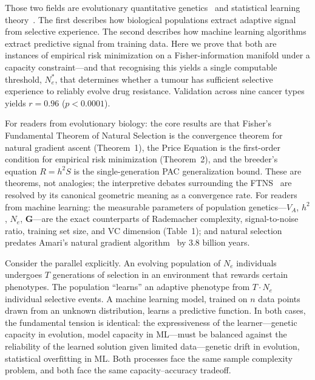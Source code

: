 \documentclass[12pt]{article}
\theoremstyle{remark}
\begin{document}
Those two fields are evolutionary quantitative genetics~\cite{fisher1918,price1970,lande1979} and statistical learning theory~\cite{vapnik1971,valiant1984}. The first describes how biological populations extract adaptive signal from selective experience. The second describes how machine learning algorithms extract predictive signal from training data. Here we prove that both are instances of empirical risk minimization on a Fisher-information manifold under a capacity constraint---and that recognising this yields a single computable threshold, $N_e^*$, that determines whether a tumour has sufficient selective experience to reliably evolve drug resistance. Validation across nine cancer types yields $r = 0.96$ ($p < 0.0001$).

For readers from evolutionary biology: the core results are that Fisher's Fundamental Theorem of Natural Selection is the convergence theorem for natural gradient ascent (Theorem~1), the Price Equation is the first-order condition for empirical risk minimization (Theorem~2), and the breeder's equation $R = h^2 S$ is the single-generation PAC generalization bound. These are theorems, not analogies; the interpretive debates surrounding the FTNS~\cite{ewens1989,lessard1997} are resolved by its canonical geometric meaning as a convergence rate. For readers from machine learning: the measurable parameters of population genetics---$V_A$, $h^2$, $N_e$, $\mathbf{G}$---are the exact counterparts of Rademacher complexity, signal-to-noise ratio, training set size, and VC dimension (Table~1); and natural selection predates Amari's natural gradient algorithm~\cite{amari1998} by 3.8 billion years.

Consider the parallel explicitly. An evolving population of $N_e$ individuals undergoes $T$ generations of selection in an environment that rewards certain phenotypes. The population ``learns'' an adaptive phenotype from $T \cdot N_e$ individual selective events. A machine learning model, trained on $n$ data points drawn from an unknown distribution, learns a predictive function. In both cases, the fundamental tension is identical: the expressiveness of the learner---genetic capacity in evolution, model capacity in ML---must be balanced against the reliability of the learned solution given limited data---genetic drift in evolution, statistical overfitting in ML. Both processes face the same sample complexity problem, and both face the same capacity--accuracy tradeoff.
\end{document}
